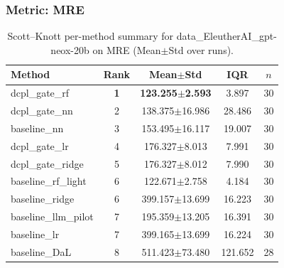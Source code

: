 \subsubsection*{Metric: MRE}
\begin{table}[H]
\centering
\scriptsize
\setlength{\tabcolsep}{4pt}
\renewcommand{\arraystretch}{1.1}
\caption{Scott--Knott per-method summary for data\_EleutherAI\_gpt-neox-20b on MRE (Mean$\pm$Std over runs).}
\label{tab:sk_data_EleutherAI_gpt-neox-20b_MRE}
\begin{tabular}{l|c|c|c|c}
\hline
\textbf{Method} & \textbf{Rank} & \textbf{Mean$\pm$Std} & \textbf{IQR} & \textbf{$n$} \\
\hline
\rowcolor{red!15} dcpl\_gate\_rf & \textbf{1} & \textbf{123.255$\pm$2.593} & 3.897 & 30 \\
dcpl\_gate\_nn & 2 & 138.375$\pm$16.986 & 28.486 & 30 \\
baseline\_nn & 3 & 153.495$\pm$16.117 & 19.007 & 30 \\
dcpl\_gate\_lr & 4 & 176.327$\pm$8.013 & 7.991 & 30 \\
dcpl\_gate\_ridge & 5 & 176.327$\pm$8.012 & 7.990 & 30 \\
baseline\_rf\_light & 6 & 122.671$\pm$2.758 & 4.184 & 30 \\
baseline\_ridge & 6 & 399.157$\pm$13.699 & 16.223 & 30 \\
baseline\_llm\_pilot & 7 & 195.359$\pm$13.205 & 16.391 & 30 \\
baseline\_lr & 7 & 399.165$\pm$13.699 & 16.224 & 30 \\
baseline\_DaL & 8 & 511.423$\pm$73.480 & 121.652 & 28 \\
\hline
\end{tabular}
\end{table}

